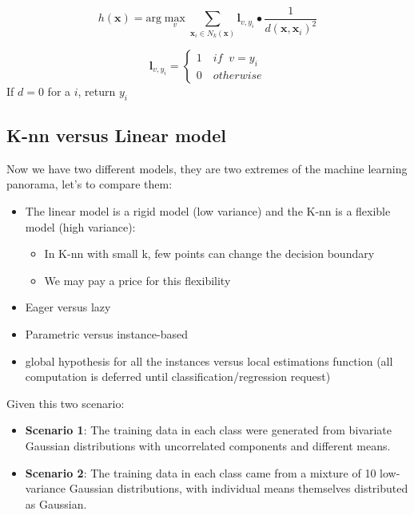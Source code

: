 \documentclass[../main.tex]{subfiles}
\begin{document}
\[
    h(\mathbf{x}) = \mbox{arg}\max_{v} \sum_{\mathbf{x}_i \in N_k(\mathbf{x})}^{}\mathbf{l}_{v, y_i} \bullet \frac{1}{d(\mathbf{x},\mathbf{x}_i)^2}
\]

\[
    \mathbf{l}_{v, y_i} = \left\{
                \begin{array}{ll}
                  1 \quad if \;\; v = y_i\\
                  0 \quad otherwise
                \end{array}
              \right.
\]
If $d = 0$ for a $i$, return $y_i$

\subsection{K-nn versus Linear model}
Now we have two different models, they are two extremes of the machine learning panorama, let's to compare them:
\begin{itemize}
    \item The linear model is a rigid model (low variance) and the K-nn is a flexible model (high variance):
    \begin{itemize}
        \item In K-nn with small k, few points can change the decision boundary
        \item We may pay a price for this flexibility
    \end{itemize}
    
    \item Eager versus lazy
    
    \item Parametric versus instance-based
    
    \item global hypothesis for all the instances versus local estimations function (all computation is deferred until classification/regression request) 
\end{itemize}
Given this two scenario:
\begin{itemize}
    \item \textbf{Scenario 1}: The training data in each class were generated from bivariate Gaussian distributions with uncorrelated components and different means.
    \item \textbf{Scenario 2}: The training data in each class came from a mixture of 10 low- variance Gaussian distributions, with individual means themselves distributed as Gaussian.
\end{itemize}
\end{document}
